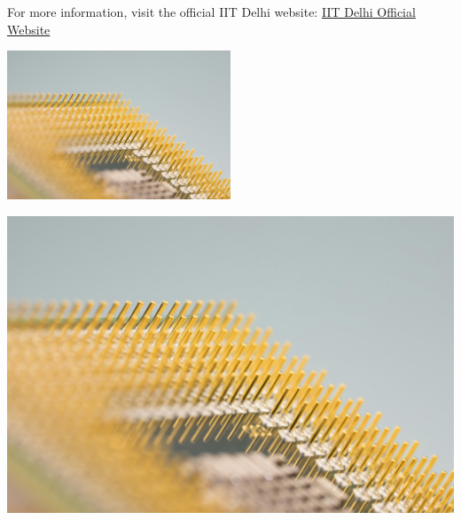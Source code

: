 \documentclass{article}
\begin{document}
For more information, visit the official IIT Delhi website: 
\href{https://www.iitd.ac.in}{IIT Delhi Official Website}

\includegraphics[width=0.5\textwidth]{./images/technology.jpg}

\includegraphics{./images/technology.jpg}
\end{document}

